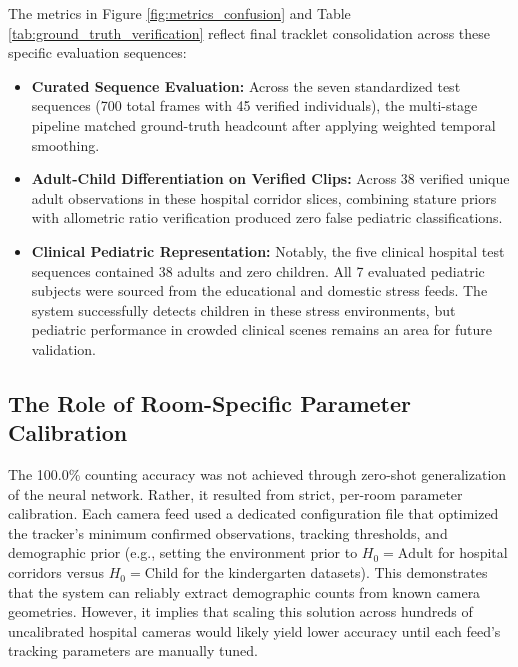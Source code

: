 The metrics in Figure \ref{fig:metrics_confusion} and Table \ref{tab:ground_truth_verification} reflect final tracklet consolidation across these specific evaluation sequences:
\begin{itemize}
    \item \textbf{Curated Sequence Evaluation:} Across the seven standardized test sequences (700 total frames with 45 verified individuals), the multi-stage pipeline matched ground-truth headcount after applying weighted temporal smoothing.
    \item \textbf{Adult-Child Differentiation on Verified Clips:} Across 38 verified unique adult observations in these hospital corridor slices, combining stature priors with allometric ratio verification produced zero false pediatric classifications.
    \item \textbf{Clinical Pediatric Representation:} Notably, the five clinical hospital test sequences contained 38 adults and zero children. All 7 evaluated pediatric subjects were sourced from the educational and domestic stress feeds. The system successfully detects children in these stress environments, but pediatric performance in crowded clinical scenes remains an area for future validation.
\end{itemize}

\subsection{The Role of Room-Specific Parameter Calibration}
The 100.0\% counting accuracy was not achieved through zero-shot generalization of the neural network. Rather, it resulted from strict, per-room parameter calibration. Each camera feed used a dedicated configuration file that optimized the tracker's minimum confirmed observations, tracking thresholds, and demographic prior (e.g., setting the environment prior to $H_0 = \text{Adult}$ for hospital corridors versus $H_0 = \text{Child}$ for the kindergarten datasets). This demonstrates that the system can reliably extract demographic counts from known camera geometries. However, it implies that scaling this solution across hundreds of uncalibrated hospital cameras would likely yield lower accuracy until each feed's tracking parameters are manually tuned.

